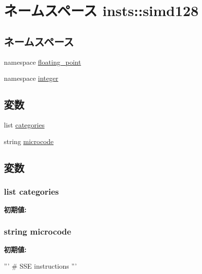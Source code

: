 \hypertarget{namespaceinsts_1_1simd128}{
\section{ネームスペース insts::simd128}
\label{namespaceinsts_1_1simd128}
}
\subsection*{ネームスペース}
\begin{DoxyCompactItemize}
\item 
namespace \hyperlink{namespaceinsts_1_1simd128_1_1floating__point}{floating\_\-point}
\item 
namespace \hyperlink{namespaceinsts_1_1simd128_1_1integer}{integer}
\end{DoxyCompactItemize}
\subsection*{変数}
\begin{DoxyCompactItemize}
\item 
list \hyperlink{namespaceinsts_1_1simd128_a273cf0f1630af14c1582f05e53354a55}{categories}
\item 
string \hyperlink{namespaceinsts_1_1simd128_a770f11a173e99389a8802f0107ed8f52}{microcode}
\end{DoxyCompactItemize}


\subsection{変数}
\hypertarget{namespaceinsts_1_1simd128_a273cf0f1630af14c1582f05e53354a55}{
\subsubsection[{categories}]{\setlength{\rightskip}{0pt plus 5cm}list {\bf categories}}}
\label{namespaceinsts_1_1simd128_a273cf0f1630af14c1582f05e53354a55}
{\bfseries 初期値:}
\begin{DoxyCode}
\end{DoxyCode}
\hypertarget{namespaceinsts_1_1simd128_a770f11a173e99389a8802f0107ed8f52}{
\subsubsection[{microcode}]{\setlength{\rightskip}{0pt plus 5cm}string {\bf microcode}}}
\label{namespaceinsts_1_1simd128_a770f11a173e99389a8802f0107ed8f52}
{\bfseries 初期値:}
\begin{DoxyCode}
'''
# SSE instructions
'''
\end{DoxyCode}
